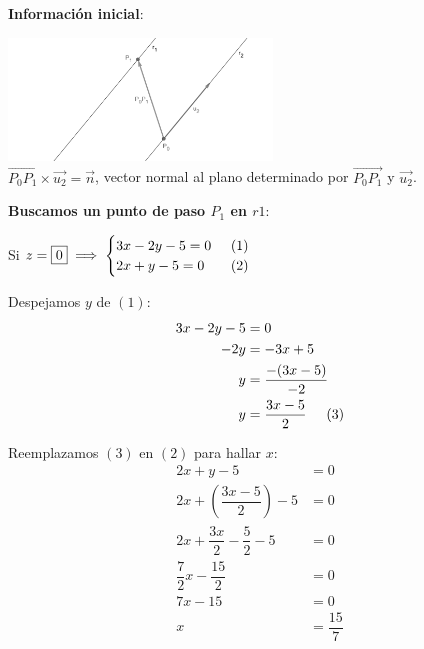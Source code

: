 \noindent  \textbf{Información inicial}:
\begin{multicols}{2}
	\includegraphics[width=7cm, scale=0.8]{12b1.png} \\
	$\overrightarrow{P_0P_1} \times \vec{u_2} = \vec{n}$, vector normal al plano determinado por $\overrightarrow{P_0P_1}$ y $\vec{u_2}$.
\end{multicols}

\noindent \textbf{Buscamos un punto de paso $P_1$ en $r1$}:
\begin{multicols}{2}
	\noindent Si $z=\boxed{0} \implies \begin{cases}
			3x - 2y - 5 = 0 \hspace{0.5cm} (1) \\
			2x + y - 5 = 0 \hfill (2)
		\end{cases}$

	\noindent Despejamos $y$ de $(1)$:
	\begin{align*}
		3x - 2y - 5 & = 0                                    \\
		-2y         & = -3x + 5                              \\
		y           & = \dfrac{-(3x - 5)}{-2}                \\
		y           & = \dfrac{3x - 5}{2} \hspace{0.5cm} (3)
	\end{align*}

	\noindent Reemplazamos $(3)$ en $(2)$ para hallar $x$:
	\begin{align*}
		2x + y - 5                                & = 0                    \\
		2x + \left( \dfrac{3x - 5}{2} \right) - 5 & = 0                    \\
		2x + \dfrac{3x}{2} - \dfrac{5}{2} -5      & =0                     \\
		\dfrac{7}{2}x - \dfrac{15}{2}             & = 0                    \\
		7x - 15                                   & = 0                    \\
		x                                         & =\boxed{\dfrac{15}{7}}
	\end{align*}


\end{multicols}
